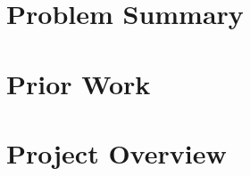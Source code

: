 

\section{Problem Summary}
    
    
\section{Prior Work}
    

\section{Project Overview}
\label{section:projectOverview}
    



\newpage
